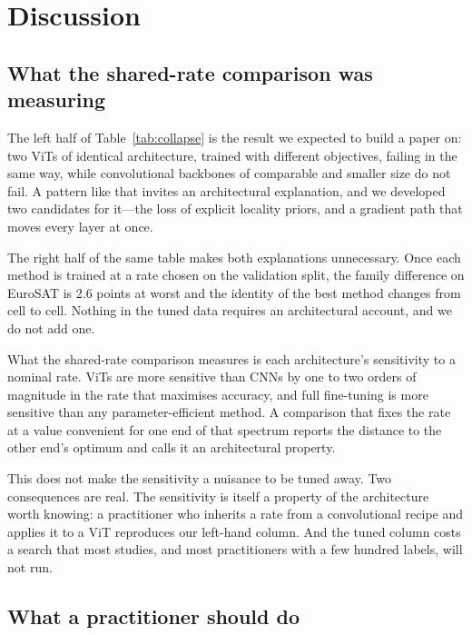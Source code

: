 \documentclass[preprint,12pt]{elsarticle}
\begin{document}
\section{Discussion}
\label{sec:discussion}

\subsection{What the shared-rate comparison was measuring}

The left half of Table~\ref{tab:collapse} is the result we expected to build a
paper on: two ViTs of identical architecture, trained with different objectives,
failing in the same way, while convolutional backbones of comparable and smaller
size do not fail. A pattern like that invites an architectural explanation, and we
developed two candidates for it---the loss of explicit locality priors, and a
gradient path that moves every layer at once.

The right half of the same table makes both explanations unnecessary. Once each
method is trained at a rate chosen on the validation split, the family difference
on EuroSAT is 2.6 points at worst and the identity of the best method changes from
cell to cell. Nothing in the tuned data requires an architectural account, and we
do not add one.

What the shared-rate comparison measures is each architecture's sensitivity to a
nominal rate. ViTs are more sensitive than CNNs by one to two orders of magnitude
in the rate that maximises accuracy, and full fine-tuning is more sensitive than
any parameter-efficient method. A comparison that fixes the rate at a value
convenient for one end of that spectrum reports the distance to the other end's
optimum and calls it an architectural property.

This does not make the sensitivity a nuisance to be tuned away. Two consequences
are real. The sensitivity is itself a property of the architecture worth knowing:
a practitioner who inherits a rate from a convolutional recipe and applies it to a
ViT reproduces our left-hand column. And the tuned column costs a search that most
studies, and most practitioners with a few hundred labels, will not run.

\subsection{What a practitioner should do}
\end{document}
